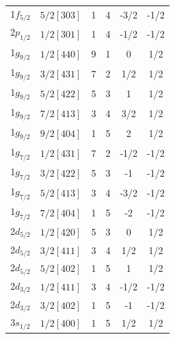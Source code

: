 \documentclass[8pt,a4paper, twoside]{report}
\begin{document}
\begin{table}[htbp]
\begin{tabular}{|c|c|c|c|c|c|}
1$f_{5/2}$ & $5/2[303]$            & 1          & 4             & -3/2      & -1/2         \\
2$p_{1/2}$ & $1/2[301]$            & 1          & 4             & -1/2      & -1/2         \\
\midrule
1$g_{9/2}$ & $1/2[440]$            & 9          & 1             & 0        & 1/2       \\
1$g_{9/2}$ & $3/2[431]$            & 7          & 2             & 1/2      & 1/2         \\
1$g_{9/2}$ & $5/2[422]$            & 5          & 3             & 1        & 1/2       \\
1$g_{9/2}$ & $7/2[413]$            & 3          & 4             & 3/2      & 1/2         \\
1$g_{9/2}$ & $9/2[404]$            & 1          & 5             & 2        & 1/2       \\
1$g_{7/2}$ & $1/2[431]$            & 7          & 2             & -1/2      & -1/2         \\
1$g_{7/2}$ & $3/2[422]$            & 5          & 3             & -1          & -1/2     \\
1$g_{7/2}$ & $5/2[413]$            & 3          & 4             & -3/2      & -1/2         \\ 
1$g_{7/2}$ & $7/2[404]$            & 1          & 5             & -2        & -1/2       \\
2$d_{5/2}$ & $1/2[420]$            & 5          & 3             & 0         & 1/2      \\
2$d_{5/2}$ & $3/2[411]$            & 3          & 4             & 1/2      & 1/2         \\
2$d_{5/2}$ & $5/2[402]$            & 1          & 5             & 1    & 1/2  \\
2$d_{3/2}$ & $1/2[411]$            & 3          & 4             & -1/2     & -1/2          \\
2$d_{3/2}$ & $3/2[402]$            & 1          & 5             & -1       & -1/2        \\
3$s_{1/2}$ & $1/2[400]$            & 1          & 5             & 1/2       & 1/2        \\
\bottomrule
\bottomrule
\end{tabular}
\end{table}
\end{document}
